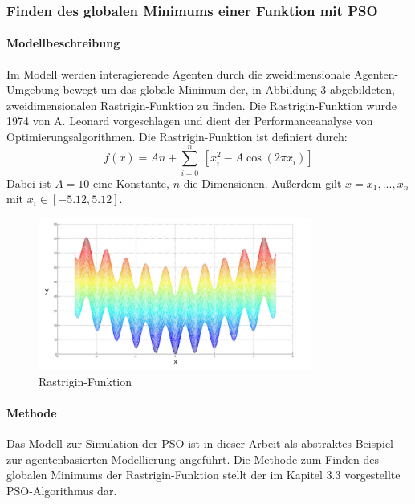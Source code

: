 \documentclass[a4paper, 11pt]{article}
\begin{document}
\subsubsection{Finden des globalen Minimums einer Funktion mit \acs{PSO}}
\paragraph{Modellbeschreibung}
Im Modell werden interagierende Agenten durch die zweidimensionale Agenten-Umgebung bewegt um das globale Minimum der, in Abbildung 3 abgebildeten, zweidimensionalen Rastrigin-Funktion zu finden. Die Rastrigin-Funktion wurde 1974 von A. Leonard vorgeschlagen und dient der Performanceanalyse von Optimierungsalgorithmen. Die Rastrigin-Funktion ist definiert durch:\newline
\begin{equation}
f(x) = An +  \sum_{i=0}^n \ [x_{i}^2 - A \cos (2\pi x_{i})]
\end{equation}
Dabei ist $A = 10$ eine Konstante, $n$ die Dimensionen. Außerdem gilt $x = {x_{1},...,x_{n}}$ mit $x_{i} \in [-5.12,5.12]$.\newline
\begin{figure}[h]
	\begin{center}
		\includegraphics[width=0.8\textwidth]{rastrigin}
	\end{center}
	\hspace{1in}\parbox{4in}{\caption[Rastrigin-Funktion]{Rastrigin-Funktion}}
	\label{rastabb}
\end{figure}
\paragraph{Methode}
Das Modell zur Simulation der \acs{PSO} ist in dieser Arbeit als abstraktes Beispiel zur agentenbasierten Modellierung angeführt. Die Methode zum Finden des globalen Minimums der Rastrigin-Funktion stellt der im Kapitel 3.3 vorgestellte \acs{PSO}-Algorithmus dar.
\end{document}
